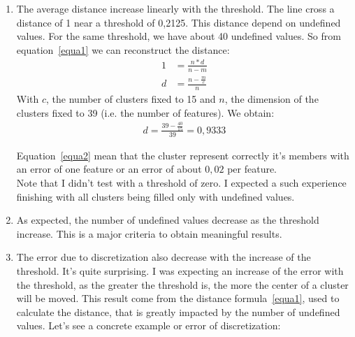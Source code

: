 \documentclass[12pt]{article}
\begin{document}
\begin{enumerate}
\item The average distance increase linearly with the threshold. The line cross a distance of 1 near a threshold of 0,2125. This distance depend on undefined values. For the same threshold, we have about 40 undefined values. So from equation~\ref{equa1} we can reconstruct the distance:\begin{align*}
1 &=\frac{n*d}{n-m}\\
d &= \frac{n-\frac{m}{c}}{n}
\end{align*} With $c$, the number of clusters fixed to 15 and $n$, the dimension of the clusters fixed to 39 (i.e. the number of features). We obtain:\begin{align}\label{equa2}
d = \frac{39-\frac{40}{15}}{39} = 0,9333
\end{align}

Equation~\ref{equa2} mean that the cluster represent correctly it's members with an error of one feature or an error of about $0,02$ per feature.\\ Note that I didn't test with a threshold of zero. I expected a such experience finishing with all clusters being filled only with undefined values.
\item As expected, the number of undefined values decrease as the threshold increase. This is a major criteria to obtain meaningful results.
\item The error due to discretization also decrease with the increase of the threshold. It's quite surprising. I was expecting an increase of the error with the threshold, as the greater the threshold is, the more the center of a cluster will be moved. This result come from the distance formula~\ref{equa1}, used to calculate the distance, that is greatly impacted by the number of undefined values. Let's see a concrete example or error of discretization:\\


\end{enumerate}
\end{document}

